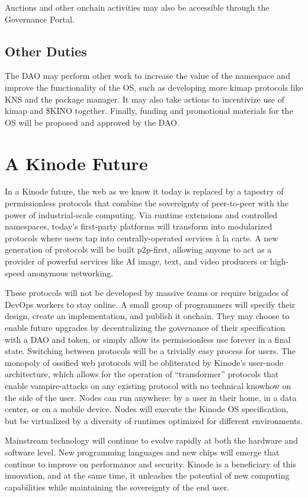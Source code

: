 \documentclass[runningheads]{llncs}
\begin{document}
Auctions and other onchain activities may also be accessible through the Governance Portal.

\subsection{Other Duties}
\label{sec:daoduties}

The DAO may perform other work to increase the value of the namespace and improve the functionality of the OS, such as developing more kimap protocols like KNS and the package manager.
It may also take actions to incentivize use of kimap and \$KINO together.
Finally, funding and promotional materials for the OS will be proposed and approved by the DAO.

\section{A Kinode Future}
\label{sec:future}

In a Kinode future, the web as we know it today is replaced by a tapestry of permissionless protocols that combine the sovereignty of peer-to-peer with the power of industrial-scale computing.
Via runtime extensions and controlled namespaces, today's first-party platforms will transform into modularized protocols where users tap into centrally-operated services à la carte.
A new generation of protocols will be built p2p-first, allowing anyone to act as a provider of powerful services like AI image, text, and video producers or high-speed anonymous networking.

These protocols will not be developed by massive teams or require brigades of DevOps workers to stay online.
A small group of programmers will specify their design, create an implementation, and publish it onchain.
They may choose to enable future upgrades by decentralizing the governance of their specification with a DAO and token, or simply allow its permissionless use forever in a final state.
Switching between protocols will be a trivially easy process for users.
The monopoly of ossified web protocols will be obliterated by Kinode's user-node architecture, which allows for the operation of ``transformer'' protocols that enable vampire-attacks on any existing protocol with no technical knowhow on the side of the user.
Nodes can run anywhere: by a user in their home, in a data center, or on a mobile device.
Nodes will execute the Kinode OS specification, but be virtualized by a diversity of runtimes optimized for different environments.

Mainstream technology will continue to evolve rapidly at both the hardware and software level. New programming languages and new chips will emerge that continue to improve on performance and security.
Kinode is a beneficiary of this innovation, and at the same time, it unleashes the potential of new computing capabilities while maintaining the sovereignty of the end user.
\end{document}
